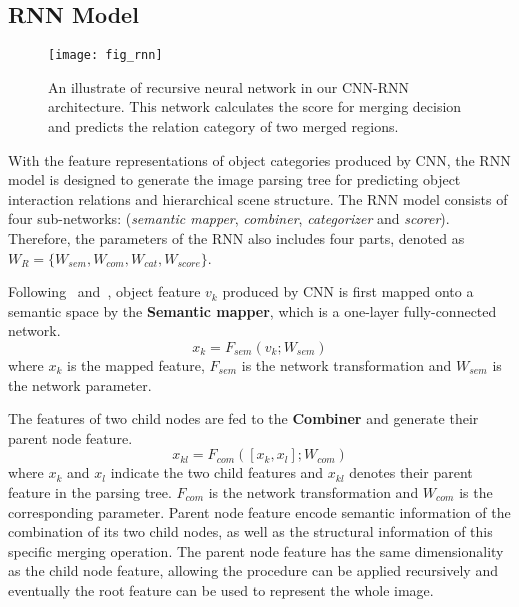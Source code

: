 \documentclass[10pt,twocolumn,letterpaper]{article}
\begin{document}
\subsection{RNN Model}
\label{sub:rnn_model}




\begin{figure}[t]
\centering
\texttt{[image: fig\_rnn]}

 \caption{An illustrate of recursive neural network in our CNN-RNN architecture. This network calculates the score for merging decision and predicts the relation category of two merged regions.}
\label{fig:RNN}
\end{figure}



With the feature representations of object categories produced by CNN, the RNN model is designed to generate the image parsing tree for predicting object interaction relations and hierarchical scene structure. The RNN model consists of four sub-networks: (\textit{semantic mapper}, \textit{combiner}, \textit{categorizer} and \textit{scorer}). Therefore, the parameters of the RNN also includes four parts, denoted as $W_R=\{W_{sem},W_{com},W_{cat},W_{score}\}$.

Following~\cite{DBLP:Recursive_Socher} and~\cite{DBLP:RecursiveContext2}, object feature $v_k$ produced by CNN is first mapped onto a semantic space by the \textbf{Semantic mapper}, which is a one-layer fully-connected network.
\begin{equation}\label{eq_sem}
x_k = F_{sem}(v_k;W_{sem})
\end{equation}
where $x_k$ is the mapped feature, $F_{sem}$ is the network transformation and $W_{sem}$ is the network parameter.

The features of two child nodes are fed to the \textbf{Combiner} and generate their parent node feature.
\begin{equation}\label{eq_com}
x_{kl} = F_{com}([x_k,x_l];W_{com})
\end{equation}
where $x_k$ and $x_l$ indicate the two child features and $x_{kl}$ denotes their parent feature in the parsing tree. $F_{com}$ is the network transformation and $W_{com}$ is the corresponding parameter. Parent node feature encode semantic information of the combination of its two child nodes, as well as the structural information of this specific merging operation. The parent node feature has the same dimensionality as the child node feature, allowing the procedure can be applied recursively and eventually the root feature can be used to represent the whole image.
\end{document}
